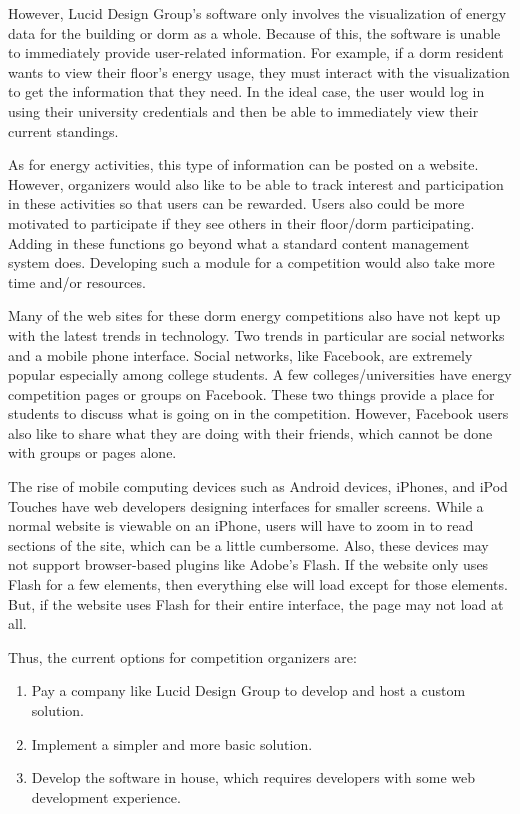 However, Lucid Design Group's software only involves the visualization of energy data for the building or dorm as a whole.  Because of this, the software is unable to immediately provide user-related information.  For example, if a dorm resident wants to view their floor's energy usage, they must interact with the visualization to get the information that they need.  In the ideal case, the user would log in using their university credentials and then be able to immediately view their current standings.

As for energy activities, this type of information can be posted on a website.  However, organizers would also like to be able to track interest and participation in these activities so that users can be rewarded.  Users also could be more motivated to participate if they see others in their floor/dorm participating.  Adding in these functions go beyond what a standard content management system does.  Developing such a module for a competition would also take more time and/or resources.

Many of the web sites for these dorm energy competitions also have not kept up with the latest trends in technology.  Two trends in particular are social networks and a mobile phone interface.  Social networks, like Facebook, are extremely popular especially among college students.  A few colleges/universities have energy competition pages or groups on Facebook.  These two things provide a place for students to discuss what is going on in the competition.  However, Facebook users also like to share what they are doing with their friends, which cannot be done with groups or pages alone.

The rise of mobile computing devices such as Android devices, iPhones, and iPod Touches have web developers designing interfaces for smaller screens.  While a normal website is viewable on an iPhone, users will have to zoom in to read sections of the site, which can be a little cumbersome.  Also, these devices may not support browser-based plugins like Adobe's Flash.  If the website only uses Flash for a few elements, then everything else will load except for those elements.  But, if the website uses Flash for their entire interface, the page may not load at all.

Thus, the current options for competition organizers are:

\begin{enumerate}
		\item Pay a company like Lucid Design Group to develop and host a custom solution.
		\item Implement a simpler and more basic solution.
		\item Develop the software in house, which requires developers with some web development experience.
\end{enumerate}

